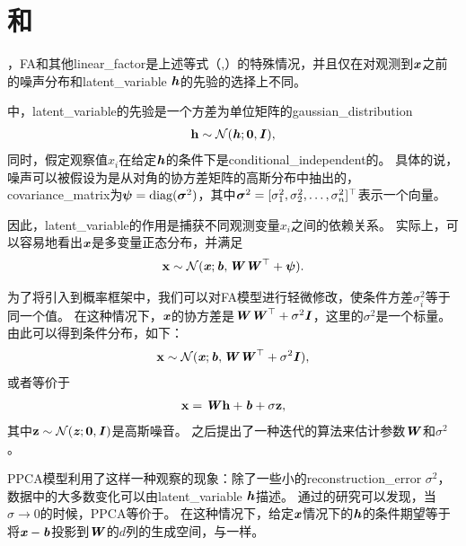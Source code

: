\section{和}
\label{sec:probabilistic_PCA_and_factor_analysis}

，\gls{FA}和其他\gls{linear_factor}是上述等式（,）的特殊情况，并且仅在对观测到$\boldsymbol{\mathit{x}}$之前的噪声分布和\gls{latent_variable} $\boldsymbol{\mathit{h}}$的先验的选择上不同。

\citep{Bartholomew-1987,Basilevsky94}中，\gls{latent_variable}的先验是一个方差为单位矩阵的\gls{gaussian_distribution}
\begin{align}
\label{eqn:133}
\mathbf{h} \sim \mathcal{N}(\boldsymbol{\mathit{h}}; \mathbf{0},\boldsymbol{\mathit{I}}),
\end{align}
同时，假定观察值$x_i$在给定$\boldsymbol{\mathit{h}}$的条件下是\gls{conditional_independent}的。
具体的说，噪声可以被假设为是从对角的协方差矩阵的高斯分布中抽出的，\gls{covariance_matrix}为$\boldsymbol{\psi} = \text{diag}(\boldsymbol{\sigma}^2)$，其中$\boldsymbol{\sigma}^2 = [\sigma_1^2,\sigma_2^2,\ldots,\sigma_n^2]^{\top}$表示一个向量。


因此，\gls{latent_variable}的作用是捕获不同观测变量$x_i$之间的依赖关系。
实际上，可以容易地看出$\boldsymbol{\mathit{x}}$是多变量正态分布，并满足
\begin{align}
\label{eqn:134}
\mathbf{x} \sim \mathcal{N}(\boldsymbol{\mathit{x}}; \boldsymbol{\mathit{b}}, \boldsymbol{\mathit{W}}\boldsymbol{\mathit{W}}^{\top}+\boldsymbol{\psi}).
\end{align}



为了将引入到概率框架中，我们可以对\gls{FA}模型进行轻微修改，使条件方差$\sigma_i^2$等于同一个值。
在这种情况下，$\boldsymbol{\mathit{x}}$的协方差是$\boldsymbol{\mathit{W}}\boldsymbol{\mathit{W}}^{\top}+\sigma^2\boldsymbol{\mathit{I}}$，这里的$\sigma^2$是一个标量。
由此可以得到条件分布，如下：
\begin{align}
\label{eqn:135}
\mathbf{x} \sim \mathcal{N}(\boldsymbol{\mathit{x}}; \boldsymbol{\mathit{b}}, \boldsymbol{\mathit{W}}\boldsymbol{\mathit{W}}^{\top} + \sigma^2\boldsymbol{\mathit{I}} ),
\end{align}
或者等价于
\begin{align}
\label{eqn:136}
\mathbf{x} = \boldsymbol{\mathit{W}}\mathbf{h} + \boldsymbol{\mathit{b}} + \sigma\mathbf{z},
\end{align}
其中$\mathbf{z} \sim \mathcal{N}(\boldsymbol{\mathit{z}};\mathbf{0},\boldsymbol{\mathit{I}})$是高斯噪音。
之后\citet{tipping99mixtures}提出了一种迭代的算法来估计参数$\boldsymbol{\mathit{W}}$和$\sigma^2$。


\gls{PPCA}模型利用了这样一种观察的现象：除了一些小的\gls{reconstruction_error} $\sigma^2$，数据中的大多数变化可以由\gls{latent_variable} $\boldsymbol{\mathit{h}}$描述。
通过\citet{tipping99mixtures}的研究可以发现，当$\sigma \xrightarrow{} 0$的时候，\gls{PPCA}等价于。
在这种情况下，给定$\boldsymbol{\mathit{x}}$情况下的$\boldsymbol{\mathit{h}}$的条件期望等于将$\boldsymbol{\mathit{x}} - \boldsymbol{\mathit{b}}$投影到$\boldsymbol{\mathit{W}}$的$d$列的生成空间，与一样。

